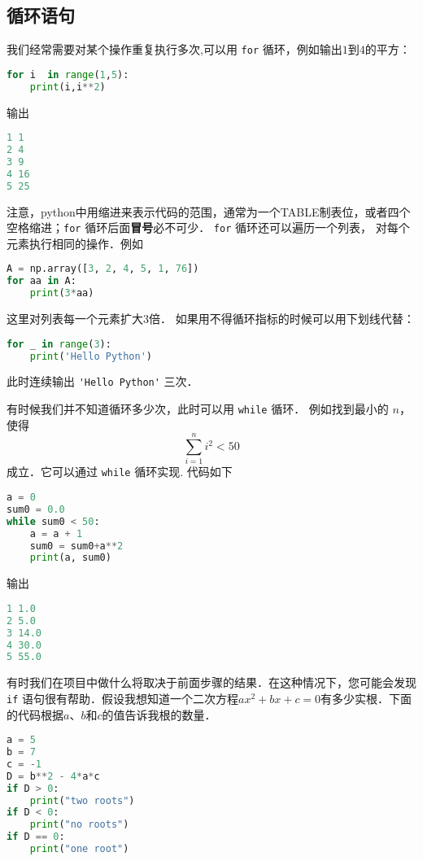 \subsection{循环语句}
我们经常需要对某个操作重复执行多次,可以用 \verb|for| 循环，例如输出$1$到$4$的平方：
\begin{lstlisting}[language=python]
for i  in range(1,5):
    print(i,i**2)
\end{lstlisting}
输出
\begin{lstlisting}[language=python]
1 1
2 4
3 9
4 16
5 25
\end{lstlisting}
注意，python中用缩进来表示代码的范围，通常为一个TABLE制表位，或者四个空格缩进；\verb|for| 循环后面\textbf{冒号}必不可少． \verb|for| 循环还可以遍历一个列表， 对每个元素执行相同的操作．例如
\begin{lstlisting}[language=python]
A = np.array([3, 2, 4, 5, 1, 76])
for aa in A:
    print(3*aa)
\end{lstlisting}
这里对列表每一个元素扩大3倍． 如果用不得循环指标的时候可以用下划线代替：
\begin{lstlisting}[language=python]
for _ in range(3):
    print('Hello Python')
\end{lstlisting}
此时连续输出   \verb|'Hello Python'|  三次．

有时候我们并不知道循环多少次，此时可以用 \verb|while| 循环． 例如找到最小的 $n$，使得
\begin{equation}
\sum_{i=1}^n i^2<50
\end{equation}
成立．它可以通过 \verb|while| 循环实现. 代码如下
\begin{lstlisting}[language=python]
a = 0
sum0 = 0.0
while sum0 < 50:
    a = a + 1
    sum0 = sum0+a**2
    print(a, sum0)
\end{lstlisting}
输出
\begin{lstlisting}[language=python]
1 1.0
2 5.0
3 14.0
4 30.0
5 55.0
\end{lstlisting}

有时我们在项目中做什么将取决于前面步骤的结果．在这种情况下，您可能会发现 \verb|if| 语句很有帮助．假设我想知道一个二次方程$ax^2+bx+c=0$有多少实根．下面的代码根据$a$、$b$和$c$的值告诉我根的数量．
\begin{lstlisting}[language=python]
a = 5
b = 7
c = -1 
D = b**2 - 4*a*c
if D > 0:
    print("two roots")
if D < 0:
    print("no roots")
if D == 0:
    print("one root")
\end{lstlisting}

